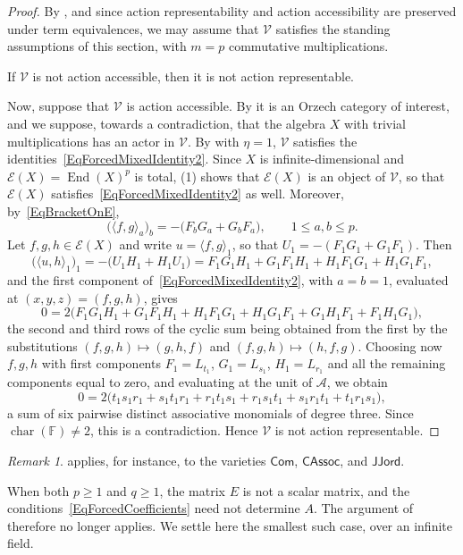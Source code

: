 \documentclass[reqno,a4paper]{amsart}
\theoremstyle{plain}
\theoremstyle{definition}
\theoremstyle{remark}
\newtheorem{remark}[subsection]{Remark}
\numberwithin{equation}{section}
\newcommand{\F}{\mathbb{F}}
\newcommand{\E}{\mathcal{E}}
\newcommand{\V}{\mathcal{V}}
\DeclareMathOperator{\bchar}{char}
\DeclareMathOperator{\End}{End}
\newcommand{\CAssoc}{\ensuremath{\mathsf{CAssoc}}}
\newcommand{\Com}{\ensuremath{\mathsf{Com}}}
\newcommand{\JJord}{\ensuremath{\mathsf{JJord}}}
\begin{document}
\begin{proof}
By , and since action representability and action accessibility are preserved under term equivalences, we may assume that $\V$ satisfies the standing assumptions of this section, with $m=p$ commutative multiplications.

If $\V$ is not action accessible, then it is not action representable. 

Now, suppose that $\V$ is action accessible. By  it is an Orzech category of interest, and we suppose, towards a contradiction, that the algebra $X$ with trivial multiplications has an actor in $\V$. By  with $\eta=1$, $\V$ satisfies the identities~\eqref{EqForcedMixedIdentity2}. Since $X$ is infinite-dimensional and $\E(X)=\End(X)^p$ is total, (1) shows that $\E(X)$ is an object of $\V$, so that $\E(X)$ satisfies~\eqref{EqForcedMixedIdentity2} as well. Moreover, by~\eqref{EqBracketOnE},
\[
\bigl(\langle f,g\rangle_a\bigr)_b=-\bigl(F_bG_a+G_bF_a\bigr),
\qquad
1\leq a,b\leq p .
\]
Let $f,g,h\in\E(X)$ and write $u=\langle f,g\rangle_1$, so that $U_1=-(F_1G_1+G_1F_1)$. Then
\[
\bigl(\langle u,h\rangle_1\bigr)_1
=
-\bigl(U_1H_1+H_1U_1\bigr)
=
F_1G_1H_1+G_1F_1H_1+H_1F_1G_1+H_1G_1F_1,
\]
and the first component of~\eqref{EqForcedMixedIdentity2}, with $a=b=1$, evaluated at $(x,y,z)=(f,g,h)$, gives
\[
0
=
2\bigl(F_1G_1H_1+G_1F_1H_1+H_1F_1G_1+H_1G_1F_1+G_1H_1F_1+F_1H_1G_1\bigr),
\]
the second and third rows of the cyclic sum being obtained from the first by the substitutions $(f,g,h)\mapsto(g,h,f)$ and $(f,g,h)\mapsto(h,f,g)$. Choosing now $f,g,h$ with first components $F_1=L_{t_1}$, $G_1=L_{s_1}$, $H_1=L_{r_1}$ and all the remaining components equal to zero, and evaluating at the unit of $\mathcal A$, we obtain
\[
0=2\bigl(t_1s_1r_1+s_1t_1r_1+r_1t_1s_1+r_1s_1t_1+s_1r_1t_1+t_1r_1s_1\bigr),
\]
a sum of six pairwise distinct associative monomials of degree three. Since $\bchar(\F)\neq2$, this is a contradiction. Hence $\V$ is not action representable.
\end{proof}

\begin{remark}\label{RemCommNotAR}
 applies, for instance, to the varieties $\Com$, $\CAssoc$, and $\JJord$.
\end{remark}

When both $p\geq1$ and $q\geq1$, the matrix $E$ is not a scalar matrix, and the conditions~\eqref{EqForcedCoefficients} need not determine $A$. The argument of  therefore no longer applies. We settle here the smallest such case, over an infinite field.
\end{document}
